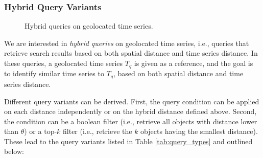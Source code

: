 \subsubsection{Hybrid Query Variants}
\label{subsec:query_types}


\begin{figure}[!t]
 \centering
\caption{Hybrid queries on geolocated time series.}
\label{fig:example_queries}
\end{figure}


We are interested in {\em hybrid queries} on geolocated time series, i.e., queries that retrieve search results based on both spatial distance and time series distance. In these queries, a geolocated time series $T_q$ is given as a reference, and the goal is to identify similar time series to $T_q$, based on both spatial distance and time series distance.


Different query variants can be derived. First, the query condition can be applied on each distance independently or on the hybrid distance defined above. Second, the condition can be a boolean filter (i.e., retrieve all objects with distance lower than $\theta$) or a top-$k$ filter (i.e., retrieve the $k$ objects having the smallest distance). These lead to the query variants listed in Table \ref{tab:query_types} and outlined below:


